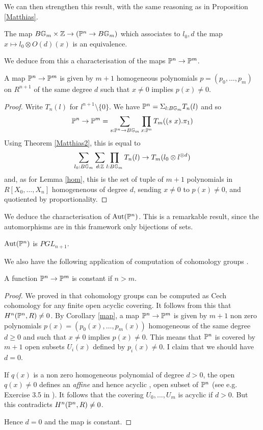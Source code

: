 We can then strengthen this result, with the same reasoning as in Proposition \ref{Matthias}.

\begin{theorem}\label{Matthias2}
  The map $B\mathbb{G}_m\times\mathbb{Z}\rightarrow (\mathbb{P}^n\rightarrow B\mathbb{G}_m)$
  which associates to $l_0,d$ the map $x\mapsto l_0\otimes O(d)(x)$ is an equivalence.
\end{theorem}

We deduce from this a characterisation of the maps $\mathbb{P}^n\rightarrow\mathbb{P}^m$.%

\begin{corollary}\label{map}
  A map $\mathbb{P}^n\rightarrow\mathbb{P}^m$ is given by $m+1$ homogeneous polynomials $p = (p_0,\dots,p_m)$ on $R^{n+1}$
  of the same   degree $d$ such that $x\neq 0$ implies $p(x)\neq 0$.
\end{corollary}

\begin{proof}
Write $T_n(l)$ for $l^{n+1}\setminus\{0\}$. We have $\mathbb{P}^n = \Sigma_{l:B\mathbb{G}_m}T_n(l)$ and so
$$
\mathbb{P}^n\rightarrow\mathbb{P}^m = \sum_{s:\mathbb{P}^n\rightarrow B\mathbb{G}_m}\prod_{x:\mathbb{P}^n}T_m((s~x).\pi_1)
$$
Using Theorem \ref{Matthias2}, this is equal to
$$
\sum_{l_0:B\mathbb{G}_m}\sum_{d:\mathbb{Z}}\prod_{l:B\mathbb{G}_m}T_n(l)\rightarrow T_m(l_0\otimes l^{\otimes d})
$$
and, as for Lemma \ref{hom}, this is the set of tuple of $m+1$ polynomials in $R[X_0,\dots,X_n]$ homogenenous
of degree $d$, sending $x\neq 0$ to $p(x)\neq 0$, and quotiented by proportionality.
\end{proof}

We deduce the characterisation of $\mathrm{Aut}(\mathbb{P}^n)$. This is a
remarkable result, since the automorphisms are in this framework only bijections of sets.

\begin{corollary}
  $\mathrm{Aut}(\mathbb{P}^n)$ is $PGL_{n+1}$.
\end{corollary}

We also have the following application of computation of cohomology groups \cite{draft}.

\begin{corollary}
A function $\mathbb{P}^n\rightarrow\mathbb{P}^m$ is constant if $n>m$.
\end{corollary}

\begin{proof}
We proved in \cite{draft} that cohomology groups can be computed as Cech cohomology for any
finite open acyclic covering. It follows from this that $H^n(\mathbb{P}^n,R)\neq 0$.
By Corollary \ref{map}, a map $\mathbb{P}^n\rightarrow\mathbb{P}^m$ is given by $m+1$ non zero polynomials
$p(x) = (p_0(x),\dots,p_m(x))$ homogeneous of the same degree $d\geqslant 0$ and such that $x\neq 0$ implies $p(x)\neq 0$.
This means that $\mathbb{P}^n$ is covered by $m+1$ open subsets $U_i(x)$ defined by $p_i(x)\neq 0$.
I claim that we should have $d=0$.

 If $q(x)$ is a non zero homogeneous polynomial of degree $d>0$, the open $q(x)\neq 0$ defines an {\em affine}
 and hence acyclic \cite{draft}, open subset of $\mathbb{P}^n$ (see e.g. Exercise 3.5 in \cite{Hartshorne}).
 It follows that the covering $U_0,\dots,U_m$ is acyclic if $d>0$. But this contradicts $H^n(\mathbb{P}^n,R)\neq 0$.

 Hence $d=0$ and the map is constant.
\end{proof}
